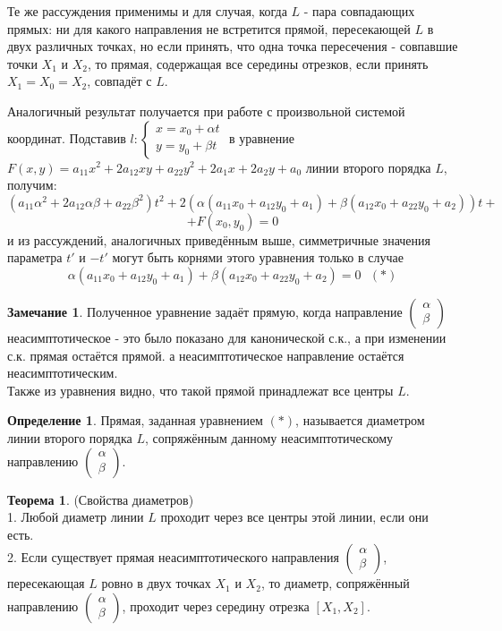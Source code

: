 \documentclass[a4paper, 12pt]{article}
\theoremstyle{definition}
\newtheorem*{definition}{Определение}
\newtheorem*{theorem}{Теорема}
\newtheorem*{remark}{Замечание}
\begin{document}
	Те же рассуждения применимы и для случая, когда $L$ - пара совпадающих прямых: ни для какого направления не встретится прямой, пересекающей $L$ в двух различных точках, но если принять, что одна точка пересечения - совпавшие точки $X_1$ и $X_2$, то прямая, содержащая все середины отрезков, если принять $X_1=X_0=X_2$, совпадёт с $L$.

	Аналогичный результат получается при работе с произвольной системой координат. Подставив $l: \begin{cases}
		x = x_0 + \alpha t\\
		y = y_0 + \beta t
		\end{cases}$
	в уравнение $F(x, y) = a_{11}x^2 + 2a_{12}xy + a_{22}y^2 + 2a_{1}x + 2a_{2}y + a_{0}$ линии второго порядка $L$, получим:$$
		(a_{11}\alpha^2 + 2a_{12}\alpha\beta+ a_{22}\beta^2)t^2 + 2(\alpha(a_{11}x_0 + a_{12}y_0 + a_1) + \beta(a_{12}x_0 + a_{22}y_0 + a_2))t +$$ $$+ F(x_0, y_0) = 0$$
	и из рассуждений, аналогичных приведённым выше, симметричные значения параметра $t'$ и $-t'$ могут быть корнями этого уравнения только в случае $$\alpha(a_{11}x_0 + a_{12}y_0 + a_1) + \beta(a_{12}x_0 + a_{22}y_0 + a_2) = 0 \ \ \ (*)$$
	\begin{remark}
		Полученное уравнение задаёт прямую, когда направление $\begin{pmatrix} \alpha \\ \beta \end{pmatrix}$ неасимптотическое - это было показано для канонической с.к., а при изменении с.к. прямая остаётся прямой. а неасимптотическое направление остаётся неасимптотическим.\\
		Также из уравнения видно, что такой прямой принадлежат все центры $L$.
	\end{remark} 
	\begin{definition}
		Прямая, заданная уравнением $(*)$, называется диаметром линии второго порядка $L$, сопряжённым данному неасимптотическому направлению $\begin{pmatrix} \alpha \\ \beta \end{pmatrix}$.
	\end{definition}
	\begin{theorem}(Свойства диаметров)\\
		1. Любой диаметр линии $L$ проходит через все центры этой линии, если они есть.\\
		2. Если существует прямая неасимптотического направления $\begin{pmatrix} \alpha \\ \beta \end{pmatrix}$, пересекающая $L$ ровно в двух точках $X_1$ и $X_2$, то диаметр, сопряжённый направлению $\begin{pmatrix} \alpha \\ \beta \end{pmatrix}$, проходит через середину отрезка $[X_1, X_2]$.
	\end{theorem}
\end{document}
